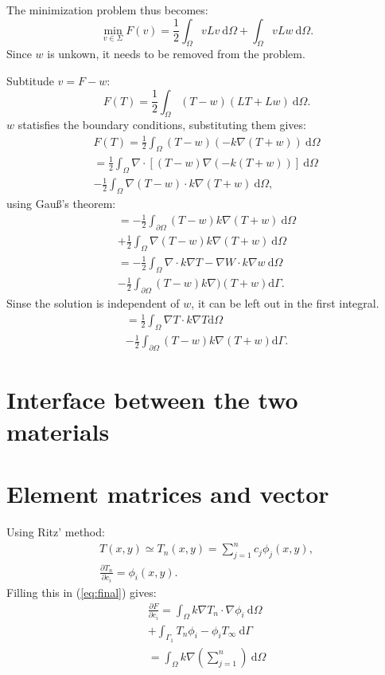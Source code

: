 The minimization problem thus becomes:
\begin{equation}
    \min_{v\in\Sigma} F(v)=\frac{1}{2}\int_{\Omega}vLv~\text{d}\Omega + \int_{\Omega}vLw~\text{d}\Omega.
\end{equation} Since $w$ is unkown, it needs to be removed from the problem.

Subtitude $v=F-w$:
\begin{equation*}
F(T)=\frac{1}{2}\int_\Omega(T-w)(LT+Lw)~\text{d}\Omega.
\end{equation*} $w$ statisfies the boundary conditions, substituting them gives:
\begin{gather*}
    F(T) = \frac{1}{2}\int_{\Omega}(T-w)(-k\nabla (T+w))~\text{d}\Omega\\
    = \frac{1}{2}\int_{\Omega}\nabla\cdot\left[(T-w)\nabla(-k(T+w))\right]~\text{d}\Omega\\
    - \frac{1}{2}\int_{\Omega}\nabla(T-w)\cdot k\nabla(T+w)~\text{d}\Omega,
\end{gather*}using Gau\ss's theorem:
\begin{gather*}
    = -\frac{1}{2}\int_{\partial\Omega}(T-w)k\nabla(T+w)~\text{d}\Omega\\
    + \frac{1}{2}\int_{\Omega}\nabla(T-w)k\nabla(T+w)~\text{d}\Omega\\
    = -\frac{1}{2}\int_{\Omega}\nabla\cdot k\nabla T - \nabla W\cdot k\nabla w~\text{d}\Omega\\
    -\frac{1}{2}\int_{\partial\Omega}(T-w)k\nabla)(T+w)\text{d}\Gamma.
\end{gather*}Sinse the solution is independent of $w$, it can be left out in the first integral.
\begin{gather*}
    = \frac{1}{2}\int_{\Omega}\nabla T\cdot k\nabla T \text{d}\Omega \\
    -\frac{1}{2}\int_{\partial\Omega}(T-w)k\nabla (T+w)\text{d}\Gamma.
\end{gather*}

\section{Interface between the two materials} 
\section{Element matrices and vector}
Using Ritz' method: 
\begin{gather*}
    T(x,y) \simeq T_n(x,y)=\sum_{j=1}^n c_j\phi_j(x,y),\\
    \frac{\partial T_n}{\partial c_i}=\phi_i(x,y).
\end{gather*} Filling this in (\ref{eq:final}) gives:
\begin{gather*}
    \frac{\partial F}{\partial c_i} = \int_{\Omega}k\nabla T_n\cdot\nabla\phi_i~\text{d}\Omega\\
    +\int_{\Gamma_1}T_n\phi_i-\phi_iT_{\infty}~\text{d}\Gamma\\
    = \int_{\Omega}k\nabla(\sum_{j=1}^n)~\text{d}\Omega
\end{gather*}